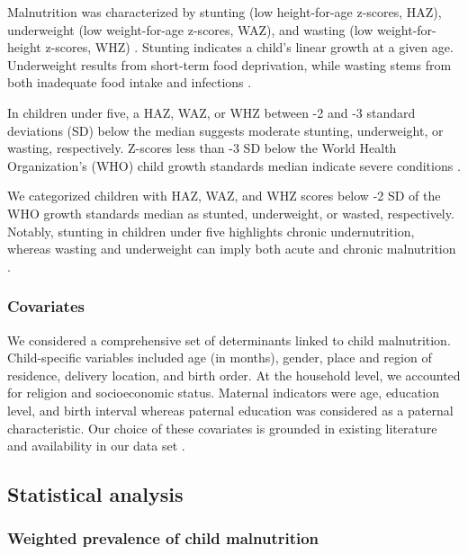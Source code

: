 \documentclass[sn-basic,Numbered,pdflatex]{sn-jnl}
\theoremstyle{remark}
\theoremstyle{definition}
\begin{document}
Malnutrition was characterized by stunting (low height-for-age z-scores,
HAZ), underweight (low weight-for-age z-scores, WAZ), and wasting (low
weight-for-height z-scores, WHZ) \citep{kien_trends_2016, jonah2018}.
Stunting indicates a child's linear growth at a given age. Underweight
results from short-term food deprivation, while wasting stems from both
inadequate food intake and infections \citep{jonah2018}.

In children under five, a HAZ, WAZ, or WHZ between -2 and -3 standard
deviations (SD) below the median suggests moderate stunting,
underweight, or wasting, respectively. Z-scores less than -3 SD below
the World Health Organization's (WHO) child growth standards median
indicate severe conditions \citep{WHO2010}.

We categorized children with HAZ, WAZ, and WHZ scores below -2 SD of the
WHO growth standards median as stunted, underweight, or wasted,
respectively. Notably, stunting in children under five highlights
chronic undernutrition, whereas wasting and underweight can imply both
acute and chronic malnutrition \citep{kien_trends_2016}.

\hypertarget{covariates}{%
\subsubsection{Covariates}\label{covariates}}

We considered a comprehensive set of determinants linked to child
malnutrition. Child-specific variables included age (in months), gender,
place and region of residence, delivery location, and birth order. At
the household level, we accounted for religion and socioeconomic status.
Maternal indicators were age, education level, and birth interval
whereas paternal education was considered as a paternal characteristic.
Our choice of these covariates is grounded in existing literature and
availability in our data set
\citep{jonah2018, kien_trends_2016, Farah2019}.

\hypertarget{statistical-analysis}{%
\subsection{Statistical analysis}\label{statistical-analysis}}

\hypertarget{weighted-prevalence-of-child-malnutrition}{%
\subsubsection{Weighted prevalence of child
malnutrition}\label{weighted-prevalence-of-child-malnutrition}}
\end{document}
